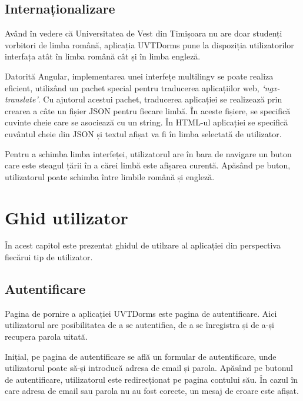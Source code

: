 \documentclass[12pt,a4paper]{report}
\theoremstyle{definition}
\theoremstyle{remark}
\begin{document}
\section{Internaționalizare}

\par Având în vedere că Universitatea de Vest din Timișoara nu are doar studenți vorbitori de limba română, aplicația UVTDorms pune la dispoziția utilizatorilor interfața atât în limba română cât și în limba engleză.

\par Datorită Angular, implementarea unei interfețe multilingv se poate realiza eficient, utilizând un pachet special pentru traducerea aplicațiilor web, \textit{`ngx-translate'}\cite{ngx_translate}. Cu ajutorul acestui pachet, traducerea aplicației se realizează prin crearea a câte un fișier JSON pentru fiecare limbă. În aceste fișiere, se specifică cuvinte cheie care se asociează cu un string. În HTML-ul aplicației se specifică cuvântul cheie din JSON și textul afișat va fi în limba selectată de utilizator.

\par Pentru a schimba limba interfeței, utilizatorul are în bara de navigare un buton care este steagul țării în a cărei limbă este afișarea curentă. Apăsând pe buton, utilizatorul poate schimba între limbile română și engleză.


\chapter{Ghid utilizator}
În acest capitol este prezentat ghidul de utilzare al aplicației din perspectiva fiecărui tip de utilizator.
\section{Autentificare}

\par Pagina de pornire a aplicației UVTDorms este pagina de autentificare. Aici utilizatorul are posibilitatea de a se autentifica, de a se înregistra și de a-și recupera parola uitată.

\par Inițial, pe pagina de autentificare se află un formular de autentificare, unde utilizatorul poate să-și introducă adresa de email și parola. Apăsând pe butonul de autentificare, utilizatorul este redirecționat pe pagina contului său. În cazul în care adresa de email sau parola nu au fost corecte,  un mesaj de eroare este afișat.
\end{document}

